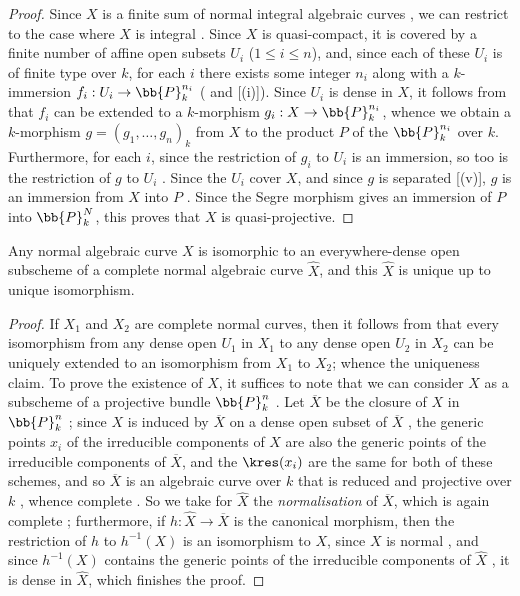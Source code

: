 \begin{proof}
Since $X$ is a finite sum of normal integral algebraic curves , we can restrict to the case where $X$ is integral .
Since $X$ is quasi-compact, it is covered by a finite number of affine open subsets $U_i$ ($1\leq i\leq n$), and, since each of these $U_i$ is of finite type over $k$, for each $i$ there exists some integer $n_i$ along with a $k$-immersion $f_i:U_i\to\bb{P}_k^{n_i}$ ( and [(i)]).
Since $U_i$ is dense in $X$, it follows from  that $f_i$ can be extended to a $k$-morphism $g_i:X\to\bb{P}_k^{n_i}$, whence we obtain a $k$-morphism $g=(g_1,\ldots,g_n)_k$ from $X$ to the product $P$ of the $\bb{P}_k^{n_i}$ over $k$.
Furthermore, for each $i$, since the restriction of $g_i$ to $U_i$ is an immersion, so too is the restriction of $g$ to $U_i$ .
Since the $U_i$ cover $X$, and since $g$ is separated [(v)], $g$ is an immersion from $X$ into $P$ .
Since the Segre morphism  gives an immersion of $P$ into $\bb{P}_k^N$, this proves that $X$ is quasi-projective.
\end{proof}

\begin{corollary}[7.4.11]
\label{II.7.4.11}
Any normal algebraic curve $X$ is isomorphic to an everywhere-dense open subscheme of a complete normal algebraic curve $\widehat{X}$, and this $\widehat{X}$ is unique up to unique isomorphism.
\end{corollary}

\begin{proof}
If $X_1$ and $X_2$ are complete normal curves, then it follows from  that every isomorphism from any dense open $U_1$ in $X_1$ to any dense open $U_2$ in $X_2$ can be uniquely extended to an isomorphism from $X_1$ to $X_2$;
whence the uniqueness claim.
To prove the existence of $\widehat{X}$, it suffices to note that we can consider $X$ as a subscheme of a projective bundle $\bb{P}_k^n$ .
Let $\overline{X}$ be the closure of $X$ in $\bb{P}_k^n$ ;
since $X$ is induced by $\overline{X}$ on a dense open subset of $\overline{X}$ , the generic points $x_i$ of the irreducible components of $X$ are also the generic points of the irreducible components of $\overline{X}$, and the $\kres(x_i)$ are the same for both of these schemes, and so  $\overline{X}$ is an algebraic curve over $k$ that is reduced  and projective over $k$ , whence complete .
So we take for $\widehat{X}$ the \emph{normalisation} of $\overline{X}$, which is again complete ;
furthermore, if $h:\widehat{X}\to\overline{X}$ is the canonical morphism, then the restriction of $h$ to $h^{-1}(X)$ is an isomorphism to $X$, since $X$ is normal , and since $h^{-1}(X)$ contains the generic points of the irreducible components of $\widehat{X}$ , it is dense in $\widehat{X}$, which finishes the proof.
\end{proof}

